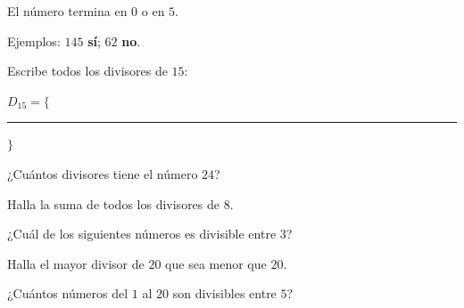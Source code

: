 \documentclass{xgodel-ficha}
\begin{document}
\begin{ficha}
\begin{apartados}
\item {}
  El número termina en $0$ o en $5$.
  \par\smallskip
  Ejemplos: $145$ \textbf{sí}; \; $62$ \textbf{no}.

\end{apartados}


\begin{ejercicios}

\item Escribe todos los divisores de $15$:
  \par\smallskip
  $D_{15} = \{$ \rule{34mm}{0.4pt} $\}$

\item ¿Cuántos divisores tiene el número $24$?

\item Halla la suma de todos los divisores de $8$.

\item ¿Cuál de los siguientes números es divisible entre $3$?

\item Halla el mayor divisor de $20$ que sea menor que $20$.

\item ¿Cuántos números del $1$ al $20$ son divisibles entre $5$?

\end{ejercicios}

\end{ficha}
\end{document}

